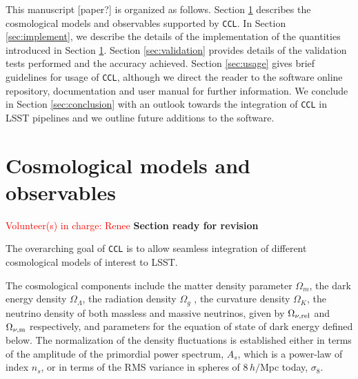 \documentclass[\docopts]{\docclass}
\newcommand{\vol}[1]{\textcolor{red}{Volunteer(s) in charge: #1}}
\newcommand{\revise}{\textcolor{red!55!blue}{\bf Section ready for revision}}
\newcommand{\ccl}{{\tt CCL}\xspace}
\begin{document}
This manuscript [paper?] is organized as follows. Section \ref{sec:models} describes the cosmological models and observables supported by \ccl. In Section \ref{sec:implement}, we describe the details of the implementation of the quantities introduced in Section \ref{sec:models}. Section \ref{sec:validation} provides details of the validation tests performed and the accuracy achieved. Section \ref{sec:usage} gives brief guidelines for usage of \ccl, although we direct the reader to the software online repository, documentation and user manual for further information. We conclude in Section \ref{sec:conclusion} with an outlook towards the integration of \ccl in LSST pipelines and we outline future additions to the software. 


\section{Cosmological models and observables}
\label{sec:models}
\vol{Renee}
\revise

The overarching goal of \ccl is to allow seamless integration of different cosmological models of interest to LSST.

The cosmological components include the matter density parameter $\Omega_m$, the dark energy density $\Omega_\Lambda$, the radiation density $\Omega_g$ , the curvature density $\Omega_K$, the neutrino density of both massless and massive neutrinos, given by $\Omega_{\nu, {\rm rel}}$ and $\Omega_{\nu, {\rm m}}$ respectively, and parameters for the equation of state of dark energy defined below. The normalization of the density fluctuations is established either in terms of the amplitude of the primordial power spectrum, $A_s$, which is a power-law of index $n_s$, or in terms of the RMS variance in spheres of $8\,h/$Mpc today, $\sigma_8$. 
\end{document}
